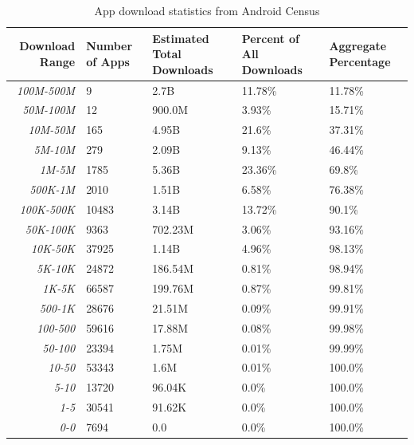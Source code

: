\begin{table}[h]
\begin{small}
\begin{tabular}{r|llll}
Download Range & Number of Apps & Estimated Total Downloads & Percent of All Downloads & Aggregate Percentage \\
\hline

\textit{100M-500M} & 9 & 2.7B & 11.78\% & 11.78\% \\
\textit{50M-100M} & 12 & 900.0M & 3.93\% & 15.71\% \\
\textit{10M-50M} & 165 & 4.95B & 21.6\% & 37.31\% \\
\textit{5M-10M} & 279 & 2.09B & 9.13\% & 46.44\% \\
\textit{1M-5M} & 1785 & 5.36B & 23.36\% & 69.8\% \\
\textit{500K-1M} & 2010 & 1.51B & 6.58\% & 76.38\% \\
\textit{100K-500K} & 10483 & 3.14B & 13.72\% & 90.1\% \\
\textit{50K-100K} & 9363 & 702.23M & 3.06\% & 93.16\% \\
\textit{10K-50K} & 37925 & 1.14B & 4.96\% & 98.13\% \\
\textit{5K-10K} & 24872 & 186.54M & 0.81\% & 98.94\% \\
\textit{1K-5K} & 66587 & 199.76M & 0.87\% & 99.81\% \\
\textit{500-1K} & 28676 & 21.51M & 0.09\% & 99.91\% \\
\textit{100-500} & 59616 & 17.88M & 0.08\% & 99.98\% \\
\textit{50-100} & 23394 & 1.75M & 0.01\% & 99.99\% \\
\textit{10-50} & 53343 & 1.6M & 0.01\% & 100.0\% \\
\textit{5-10} & 13720 & 96.04K & 0.0\% & 100.0\% \\
\textit{1-5} & 30541 & 91.62K & 0.0\% & 100.0\% \\
\textit{0-0} & 7694 & 0.0 & 0.0\% & 100.0\% \\

\end{tabular}
\end{small}
\caption{App download statistics from Android Census}
\label{tab:downloadstats}
\end{table}


